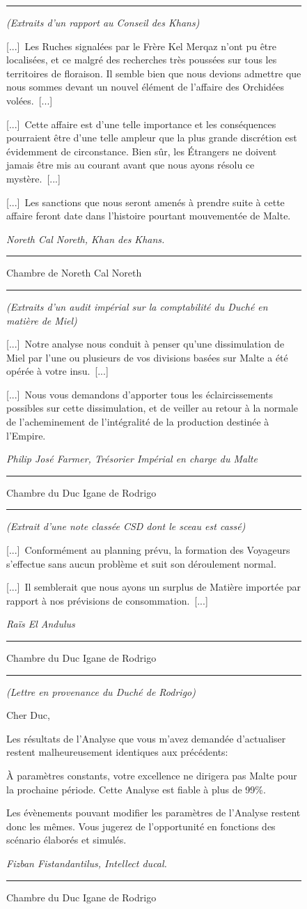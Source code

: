 \documentclass{article}
\newcommand{\newcharacter}{\clearpage\setcounter{figure}{0}}
\newcommand{\indice}[4]{
  \begin{figure}[H]
    \begin{center}
      \rule{0.5\textwidth}{1pt}
    \end{center}
    \begin{framed}
      \begin{samepage}
        \textit{#1}
        \nopagebreak

        #2

        \nopagebreak

        \hfill\textit{#3}
      \end{samepage}
    \end{framed}
    \caption{#4}
    \begin{center}
      \rule{0.5\textwidth}{1pt}
    \end{center}
  \end{figure}
}
\begin{document}
\indice
{(Extraits d'un rapport au Conseil des Khans)}
{
    [...]~Les Ruches signalées par le Frère Kel Merqaz n'ont pu être
    localisées, et ce malgré des recherches très poussées sur tous les
    territoires de floraison. Il semble bien que nous devions admettre que nous
    sommes devant un nouvel élément de \og l'affaire des Orchidées
    volées\fg{}.~[...]

    \nobreak

    [...]~Cette affaire est d'une telle importance et les conséquences
    pourraient être d'une telle ampleur que la plus grande discrétion est
    évidemment de circonstance. Bien sûr, les Étrangers ne doivent jamais être
    mis au courant avant que nous ayons résolu ce mystère.~[...]

    \nobreak

    [...]~Les sanctions que nous seront amenés à prendre suite à cette affaire
    feront date dans l'histoire pourtant mouvementée de Malte.
}{Noreth Cal Noreth, Khan des Khans.}
{Chambre de Noreth Cal Noreth}

\newcharacter

\indice
{(Extraits d'un audit impérial sur la comptabilité du Duché en matière de
Miel)}
{
    [...]~Notre analyse nous conduit à penser qu'une dissimulation de Miel par
    l'une ou plusieurs de vos divisions basées sur Malte a été opérée à votre
    insu.~[...]

    \nobreak

    [...]~Nous vous demandons d'apporter tous les éclaircissements possibles
    sur cette dissimulation, et de veiller au retour à la normale de
    l'acheminement de l'intégralité de la production destinée à l'Empire.
}{Philip José Farmer, Trésorier Impérial en charge du Malte}
{Chambre du Duc Igane de Rodrigo}

\indice
{(Extrait d'une note classée CSD dont le sceau est cassé)}
{
    [...]~Conformément au planning prévu, la formation des Voyageurs s'effectue
    sans aucun problème et suit son déroulement normal.

    \nobreak

    [...]~Il semblerait que nous ayons un surplus de Matière importée par
    rapport à nos prévisions de consommation.~[...]
}{Raïs El Andulus}
{Chambre du Duc Igane de Rodrigo}

\indice
{(Lettre en provenance du Duché de Rodrigo)}
{
    Cher Duc,

    \nobreak

    Les résultats de l'Analyse que vous m'avez demandée d'actualiser restent
    malheureusement identiques aux précédents:

    \nobreak

    À paramètres constants, votre excellence ne dirigera pas Malte pour la
    prochaine période. Cette Analyse est fiable à plus de 99\%.

    \nobreak

    Les évènements pouvant modifier les paramètres de l'Analyse restent donc
    les mêmes. Vous jugerez de l'opportunité en fonctions des scénario élaborés
    et simulés.
}{Fizban Fistandantilus, Intellect ducal.}
{Chambre du Duc Igane de Rodrigo}
\end{document}
